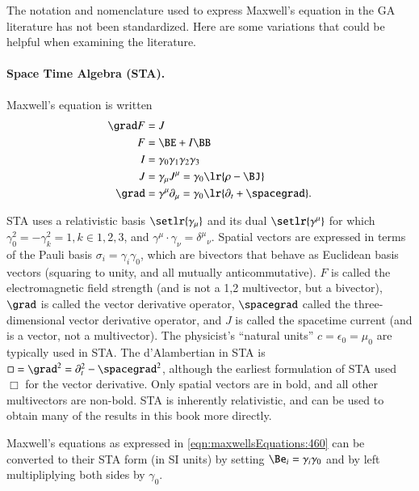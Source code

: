 %
%
The notation and nomenclature used to express Maxwell's equation in the GA literature has not been standardized.
Here are some variations that could be helpful when examining the literature.

\paragraph{Space Time Algebra (STA).  \citep{doran2003gap}}

Maxwell's equation is written
\begin{dmath}\label{eqn:galiterature:80}
\begin{aligned}
\grad F &= J \\
F &= \BE + I \BB \\
I &= \gamma_0 \gamma_1 \gamma_2 \gamma_3 \\
J &= \gamma_\mu J^\mu = \gamma_0 \lr{ \rho - \BJ } \\
\grad &= \gamma^\mu \partial_\mu = \gamma_0 \lr{ \partial_t + \spacegrad }.
\end{aligned}
\end{dmath}

STA uses a relativistic basis \( \setlr{ \gamma_\mu } \) and its dual \( \setlr{ \gamma^\mu} \) for which \( \gamma_0^2 = -\gamma_k^2 = 1, k \in 1,2,3 \), and \( \gamma^\mu \cdot \gamma_\nu = {\delta^\mu}_\nu \).
Spatial vectors are expressed in terms of the Pauli basis \( \sigma_i = \gamma_i \gamma_0 \), which are bivectors that behave as Euclidean basis vectors (squaring to unity, and all mutually anticommutative).
\( F \) is called the electromagnetic field strength (and is not a 1,2 multivector, but a bivector), \( \grad \) is called the vector derivative operator, \( \spacegrad \) called the three-dimensional vector derivative operator, and \( J \) is called the spacetime current (and is a vector, not a multivector).
The physicist's ``natural units'' \( c = \epsilon_0 = \mu_0 \) are typically used in STA.
The d'Alambertian in STA is \( \Box = \grad^2 = \partial_t^2 - \spacegrad^2 \), although the earliest
formulation of STA \citep{hestenes1966space} used \( \Box \) for the vector derivative.
Only spatial vectors are in bold, and all other multivectors are non-bold.
STA is inherently relativistic, and can be used to obtain many of the results in this book more directly.

Maxwell's equations as expressed in \cref{eqn:maxwellsEquations:460} can be converted to their STA form (in SI units) by setting \( \Be_i = \gamma_i \gamma_0 \) and by left multipliplying both sides by \( \gamma_0 \).


